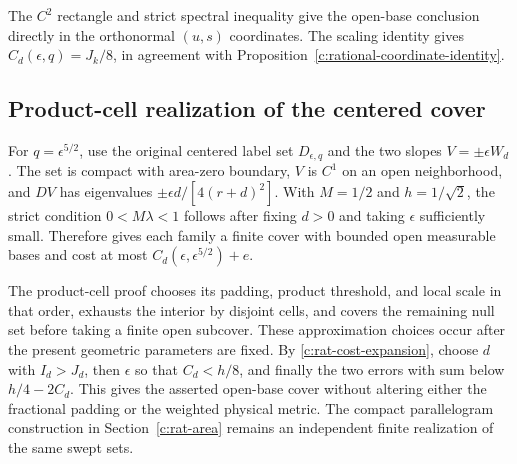 The $C^2$ rectangle and strict spectral inequality give the open-base
conclusion directly in the orthonormal $(u,s)$ coordinates.
The scaling identity gives
$C_d(\epsilon,q)=J_k/8$, in agreement with
Proposition~\ref{c:rational-coordinate-identity}.

\subsection{Product-cell realization of the centered cover}

For $q=\epsilon^{5/2}$, use the original centered label set
$D_{\epsilon,q}$ and the two slopes $V=\pm\epsilon W_d$.
The set is compact with area-zero boundary, $V$ is $C^1$ on an open
neighborhood, and $DV$ has eigenvalues
$\pm\epsilon d/[4(r+d)^2]$. With $M=1/2$ and $h=1/\sqrt2$,
the strict condition $0<M\lambda<1$ follows after fixing $d>0$
and taking $\epsilon$ sufficiently small. Therefore \BProduct{}
gives each family a finite cover with bounded open measurable bases
and cost at most $C_d(\epsilon,\epsilon^{5/2})+e$.

The product-cell proof chooses its padding, product threshold, and
local scale in that order, exhausts the interior by disjoint cells,
and covers the remaining null set before taking a finite open subcover.
These approximation choices occur after the present geometric
parameters are fixed. By \eqref{c:rat-cost-expansion}, choose $d$
with $I_d>J_d$, then $\epsilon$ so that $C_d<h/8$, and finally
the two errors with sum below $h/4-2C_d$. This gives the asserted
open-base cover without altering either the fractional padding or
the weighted physical metric. The compact parallelogram construction
in Section~\ref{c:rat-area} remains an independent finite realization
of the same swept sets.
